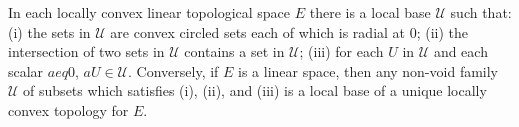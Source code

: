 In each locally convex linear topological space $E$ there is a local base $\mathcal{U}$ such that: (i) the sets in $\mathcal{U}$ are convex circled sets each of which is radial at $0$; (ii) the intersection of two sets in $\mathcal{U}$ contains a set in $\mathcal{U}$; (iii) for each $U$ in $\mathcal{U}$ and each scalar $a 
eq 0$, $aU \in \mathcal{U}$. Conversely, if $E$ is a linear space, then any non-void family $\mathcal{U}$ of subsets which satisfies (i), (ii), and (iii) is a local base of a unique locally convex topology for $E$.
